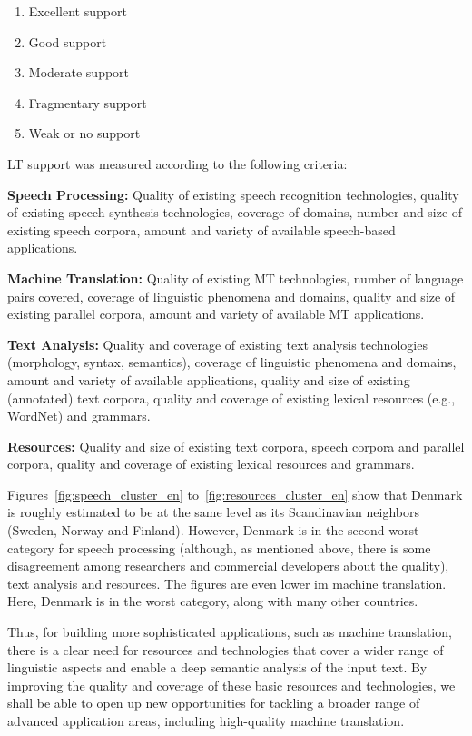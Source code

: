 \begin{multicols}{2}
\begin{enumerate}
\item Excellent support
\item Good support
\item Moderate support
\item Fragmentary support
\item Weak or no support
\end{enumerate}

LT support was measured according to the following criteria:

\textbf{Speech Processing:} Quality of existing speech recognition technologies, quality of existing speech synthesis technologies, coverage of domains, number and size of existing speech corpora, amount and variety of available speech-based applications.

\textbf{Machine Translation:} Quality of existing MT technologies, number of language pairs covered, coverage of linguistic phenomena and domains, quality and size of existing parallel corpora, amount and variety of available MT applications.

\textbf{Text Analysis:} Quality and coverage of existing text analysis technologies (morphology, syntax, semantics), coverage of linguistic phenomena and domains, amount and variety of available applications, quality and size of existing (annotated) text corpora, quality and coverage of existing lexical resources (e.g., WordNet) and grammars.

\textbf{Resources:} Quality and size of existing text corpora, speech corpora and parallel corpora, quality and coverage of existing lexical resources and grammars.

Figures~\ref{fig:speech_cluster_en} to~\ref{fig:resources_cluster_en} show that Denmark is roughly estimated to be at the same level as its Scandinavian neighbors (Sweden, Norway and Finland). However,  Denmark is in the second-worst category for speech processing (although, as mentioned above, there is some disagreement among researchers and commercial developers about the quality), text analysis and resources.
 The figures are even lower im machine translation. Here, Denmark is in the worst category, along with many other countries.

 Thus, for building more sophisticated applications, such as machine translation, there is a clear need for resources and technologies that cover a wider range of linguistic aspects and enable a deep semantic analysis of the input text. By improving the quality and coverage of these basic resources and technologies, we shall be able to open up new opportunities for tackling a broader range of advanced application areas, including high-quality machine translation.


\end{multicols}
